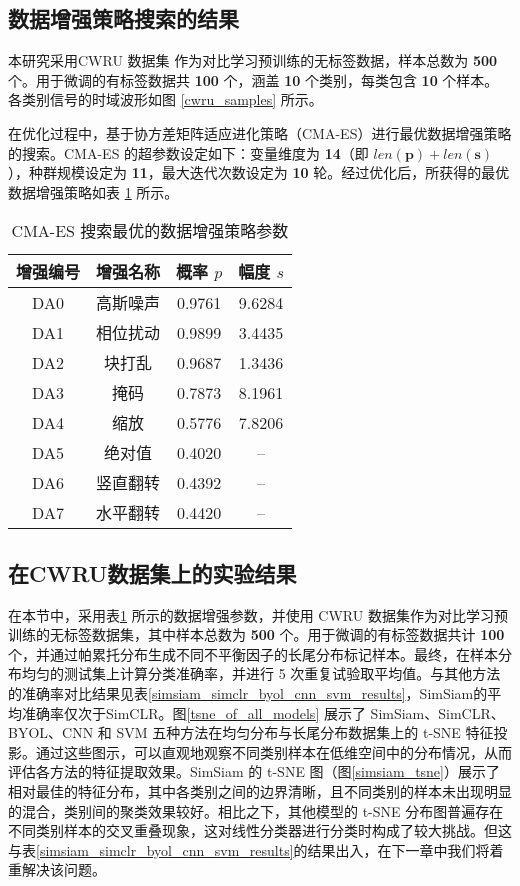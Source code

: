 \documentclass[master]{thesis-uestc}
\begin{document}
\subsection{数据增强策略搜索的结果}
\label{sec:CMA-ES_result}

本研究采用CWRU 数据集 作为对比学习预训练的无标签数据，样本总数为 \textbf{500} 个。用于微调的有标签数据共 \textbf{100} 个，涵盖 \textbf{10} 个类别，每类包含 \textbf{10} 个样本。各类别信号的时域波形如图 \ref{cwru_samples} 所示。

在优化过程中，基于协方差矩阵适应进化策略（CMA-ES）进行最优数据增强策略的搜索。CMA-ES 的超参数设定如下：变量维度为 \textbf{14}（即 \(len(\mathbf{p}) + len(\mathbf{s})\)），种群规模设定为 \textbf{11}，最大迭代次数设定为 \textbf{10} 轮。经过优化后，所获得的最优数据增强策略如表 \ref{CMA-ES_solution} 所示。

\begin{table}[H]
    \caption{CMA-ES 搜索最优的数据增强策略参数}
    \centering
    \begin{tabular}{cccc}
    \toprule
    增强编号 & 增强名称 & 概率 $p$ & 幅度 $s$\\
    \midrule
    DA0 & 高斯噪声 & 0.9761 & 9.6284 \\
    DA1 & 相位扰动 & 0.9899 & 3.4435 \\
    DA2 & 块打乱 & 0.9687 & 1.3436 \\
    DA3 & 掩码 & 0.7873 & 8.1961 \\
    DA4 & 缩放 & 0.5776 & 7.8206 \\
    DA5 & 绝对值 & 0.4020 & -- \\
    DA6 & 竖直翻转 & 0.4392 & -- \\
    DA7 & 水平翻转 & 0.4420 & -- \\
    \bottomrule
    \end{tabular}
    \label{CMA-ES_solution}
\end{table}

\subsection{在CWRU数据集上的实验结果}
\label{simsiam_cwru_results}
在本节中，采用表\ref{CMA-ES_solution} 所示的数据增强参数，并使用 CWRU 数据集作为对比学习预训练的无标签数据集，其中样本总数为 \textbf{500} 个。用于微调的有标签数据共计 \textbf{100} 个，并通过帕累托分布生成不同不平衡因子的长尾分布标记样本。最终，在样本分布均匀的测试集上计算分类准确率，并进行 5 次重复试验取平均值。与其他方法的准确率对比结果见表\ref{simsiam_simclr_byol_cnn_svm_results}，SimSiam的平均准确率仅次于SimCLR。图\ref{tsne_of_all_models} 展示了 SimSiam、SimCLR、BYOL、CNN 和 SVM 五种方法在均匀分布与长尾分布数据集上的 t-SNE 特征投影。通过这些图示，可以直观地观察不同类别样本在低维空间中的分布情况，从而评估各方法的特征提取效果。SimSiam 的 t-SNE 图（图\ref{simsiam_tsne}）展示了相对最佳的特征分布，其中各类别之间的边界清晰，且不同类别的样本未出现明显的混合，类别间的聚类效果较好。相比之下，其他模型的 t-SNE 分布图普遍存在不同类别样本的交叉重叠现象，这对线性分类器进行分类时构成了较大挑战。但这与表\ref{simsiam_simclr_byol_cnn_svm_results}的结果出入，在下一章中我们将着重解决该问题。
\end{document}
